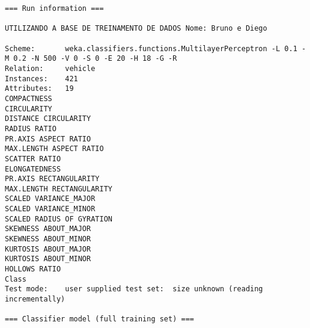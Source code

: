 \documentclass[
	article,			%
	11pt,				%
	oneside,			%
	a4paper,			%
	english,			%
	brazil,				%
	sumario=tradicional
	]{abntex2}
\begin{document}
\begin{lstlisting}
=== Run information ===

UTILIZANDO A BASE DE TREINAMENTO DE DADOS Nome: Bruno e Diego

Scheme:       weka.classifiers.functions.MultilayerPerceptron -L 0.1 -M 0.2 -N 500 -V 0 -S 0 -E 20 -H 18 -G -R
Relation:     vehicle
Instances:    421
Attributes:   19
COMPACTNESS
CIRCULARITY
DISTANCE CIRCULARITY
RADIUS RATIO
PR.AXIS ASPECT RATIO
MAX.LENGTH ASPECT RATIO
SCATTER RATIO
ELONGATEDNESS
PR.AXIS RECTANGULARITY
MAX.LENGTH RECTANGULARITY
SCALED VARIANCE_MAJOR
SCALED VARIANCE_MINOR
SCALED RADIUS OF GYRATION
SKEWNESS ABOUT_MAJOR
SKEWNESS ABOUT_MINOR
KURTOSIS ABOUT_MAJOR
KURTOSIS ABOUT_MINOR
HOLLOWS RATIO
Class
Test mode:    user supplied test set:  size unknown (reading incrementally)

=== Classifier model (full training set) ===


\end{lstlisting}
\end{document}
